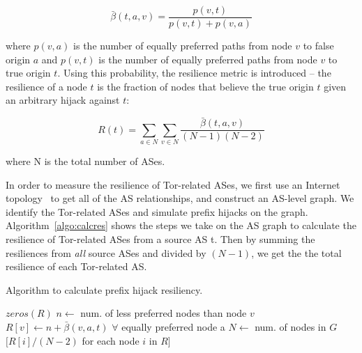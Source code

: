 \begin{equation}
\bar{\beta}(t,a,v) = \frac {p(v,t)} {p(v,t) + p(v,a)}
\end{equation}

where $p(v,a)$ is the number of equally preferred paths from node $v$ to false origin $a$ and $p(v,t)$ is the number of equally preferred paths from node $v$ to true origin $t$.  Using this probability, the resilience metric is introduced -- the resilience of a node $t$ is the fraction of nodes that believe the true origin $t$ given an arbitrary hijack against $t$:

\begin{equation}
R(t) = \sum_{a \in N} \sum_{v \in N} \frac {\bar{\beta}(t,a,v)} {(N-1)(N-2)}
\end{equation}

where N is the total number of ASes.

In order to measure the resilience of Tor-related ASes, we first use an Internet topology~\cite{caida} to get all of the AS relationships, and construct an AS-level graph.  We identify the Tor-related ASes and simulate prefix hijacks on the graph. Algorithm~\ref{algo:calcres} shows the steps we take on the AS graph to calculate the resilience of Tor-related ASes from a source AS t. Then by summing the resiliences from \emph{all} source ASes and divided by $(N-1)$, we get the the total resilience of each Tor-related AS.



\begin{algorithm}
\caption{Algorithm to calculate prefix hijack resiliency.}
\label{algo:calcres}
\begin{algorithmic}
    \State {}
    \State $zeros(R)$
		\State $n \gets $ num. of less preferred nodes than node $v$
		\State $R[v] \gets n + \bar{\beta}(v,a,t)$ $\forall$ equally preferred node a
	\EndIf
    \EndFor
    \State $N \gets$ num. of nodes in $G$
    \State \Return $[R[i] / (N-2)$ for each node $i$ in $R]$
\EndFunction
\end{algorithmic}
\end{algorithm}

